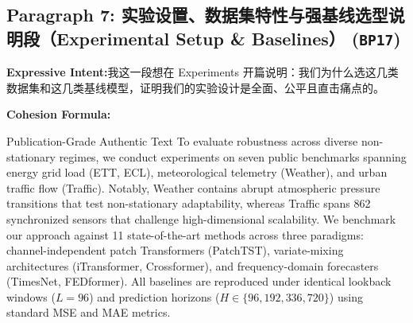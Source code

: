 \subsection*{Paragraph 7: 实验设置、数据集特性与强基线选型说明段（Experimental Setup \& Baselines） (\texttt{BP17})}
\noindent\textbf{Expressive Intent:}\enspace 我这一段想在 Experiments 开篇说明：我们为什么选这几类数据集和这几类基线模型，证明我们的实验设计是全面、公平且直击痛点的。\par
\noindent\textbf{Cohesion Formula:}\par\vspace{4pt}
\begin{ExampleBox}{Publication-Grade Authentic Text}
To evaluate robustness across diverse non-stationary regimes, we conduct experiments on seven public benchmarks spanning energy grid load (ETT, ECL), meteorological telemetry (Weather), and urban traffic flow (Traffic). Notably, Weather contains abrupt atmospheric pressure transitions that test non-stationary adaptability, whereas Traffic spans 862 synchronized sensors that challenge high-dimensional scalability. We benchmark our approach against 11 state-of-the-art methods across three paradigms: channel-independent patch Transformers (PatchTST), variate-mixing architectures (iTransformer, Crossformer), and frequency-domain forecasters (TimesNet, FEDformer). All baselines are reproduced under identical lookback windows ($L=96$) and prediction horizons ($H \in \{96, 192, 336, 720\}$) using standard MSE and MAE metrics.
\end{ExampleBox}
